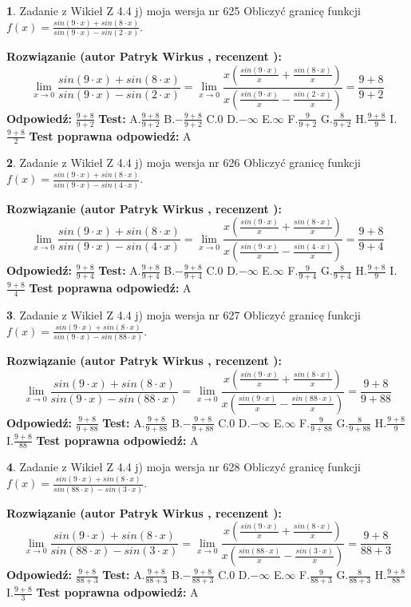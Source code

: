 \documentclass[12pt, a4paper]{article}
\theoremstyle{definition} %
\newtheorem{zad}{}
\newcommand{\zadStart}[1]{\begin{zad}#1\newline}
\newcommand{\zadStop}{\end{zad}}
\newcommand{\rozwStart}[2]{\noindent \textbf{Rozwiązanie (autor #1 , recenzent #2): }\newline}
\newcommand{\rozwStop}{\newline}
\newcommand{\odpStart}{\noindent \textbf{Odpowiedź:}\newline}
\newcommand{\odpStop}{\newline}
\newcommand{\testStart}{\noindent \textbf{Test:}\newline}
\newcommand{\testStop}{\newline}
\newcommand{\kluczStart}{\noindent \textbf{Test poprawna odpowiedź:}\newline}
\newcommand{\kluczStop}{\newline}
\begin{document}
\zadStart{Zadanie z Wikieł Z 4.4 j) moja wersja nr 625}
Obliczyć granicę funkcji $f(x)=\frac{sin(9\cdot x) +sin(8\cdot x)}{sin(9\cdot x) -sin(2\cdot x)}$.
\zadStop
\rozwStart{Patryk Wirkus}{}
$$\lim\limits_{x\to 0}\frac{sin(9\cdot x) +sin(8\cdot x)}{sin(9\cdot x) -sin(2\cdot x)}=\lim\limits_{x\to 0}\frac{x(\frac{sin(9\cdot x)}{x}+\frac{sin(8\cdot x)}{x})}{x(\frac{sin(9\cdot x)}{x}-\frac{sin(2\cdot x)}{x})}=\frac{9+8}{9+2}$$
\rozwStop
\odpStart
$\frac{9+8}{9+2}$
\odpStop
\testStart
A.$\frac{9+8}{9+2}$
B.$-\frac{9+8}{9+2}$
C.$0$
D.$-\infty$
E.$\infty$
F.$\frac{9}{9+2}$
G.$\frac{8}{9+2}$
H.$\frac{9+8}{9}$
I.$\frac{9+8}{2}$
\testStop
\kluczStart
A
\kluczStop



\zadStart{Zadanie z Wikieł Z 4.4 j) moja wersja nr 626}
Obliczyć granicę funkcji $f(x)=\frac{sin(9\cdot x) +sin(8\cdot x)}{sin(9\cdot x) -sin(4\cdot x)}$.
\zadStop
\rozwStart{Patryk Wirkus}{}
$$\lim\limits_{x\to 0}\frac{sin(9\cdot x) +sin(8\cdot x)}{sin(9\cdot x) -sin(4\cdot x)}=\lim\limits_{x\to 0}\frac{x(\frac{sin(9\cdot x)}{x}+\frac{sin(8\cdot x)}{x})}{x(\frac{sin(9\cdot x)}{x}-\frac{sin(4\cdot x)}{x})}=\frac{9+8}{9+4}$$
\rozwStop
\odpStart
$\frac{9+8}{9+4}$
\odpStop
\testStart
A.$\frac{9+8}{9+4}$
B.$-\frac{9+8}{9+4}$
C.$0$
D.$-\infty$
E.$\infty$
F.$\frac{9}{9+4}$
G.$\frac{8}{9+4}$
H.$\frac{9+8}{9}$
I.$\frac{9+8}{4}$
\testStop
\kluczStart
A
\kluczStop



\zadStart{Zadanie z Wikieł Z 4.4 j) moja wersja nr 627}
Obliczyć granicę funkcji $f(x)=\frac{sin(9\cdot x) +sin(8\cdot x)}{sin(9\cdot x) -sin(88\cdot x)}$.
\zadStop
\rozwStart{Patryk Wirkus}{}
$$\lim\limits_{x\to 0}\frac{sin(9\cdot x) +sin(8\cdot x)}{sin(9\cdot x) -sin(88\cdot x)}=\lim\limits_{x\to 0}\frac{x(\frac{sin(9\cdot x)}{x}+\frac{sin(8\cdot x)}{x})}{x(\frac{sin(9\cdot x)}{x}-\frac{sin(88\cdot x)}{x})}=\frac{9+8}{9+88}$$
\rozwStop
\odpStart
$\frac{9+8}{9+88}$
\odpStop
\testStart
A.$\frac{9+8}{9+88}$
B.$-\frac{9+8}{9+88}$
C.$0$
D.$-\infty$
E.$\infty$
F.$\frac{9}{9+88}$
G.$\frac{8}{9+88}$
H.$\frac{9+8}{9}$
I.$\frac{9+8}{88}$
\testStop
\kluczStart
A
\kluczStop



\zadStart{Zadanie z Wikieł Z 4.4 j) moja wersja nr 628}
Obliczyć granicę funkcji $f(x)=\frac{sin(9\cdot x) +sin(8\cdot x)}{sin(88\cdot x) -sin(3\cdot x)}$.
\zadStop
\rozwStart{Patryk Wirkus}{}
$$\lim\limits_{x\to 0}\frac{sin(9\cdot x) +sin(8\cdot x)}{sin(88\cdot x) -sin(3\cdot x)}=\lim\limits_{x\to 0}\frac{x(\frac{sin(9\cdot x)}{x}+\frac{sin(8\cdot x)}{x})}{x(\frac{sin(88\cdot x)}{x}-\frac{sin(3\cdot x)}{x})}=\frac{9+8}{88+3}$$
\rozwStop
\odpStart
$\frac{9+8}{88+3}$
\odpStop
\testStart
A.$\frac{9+8}{88+3}$
B.$-\frac{9+8}{88+3}$
C.$0$
D.$-\infty$
E.$\infty$
F.$\frac{9}{88+3}$
G.$\frac{8}{88+3}$
H.$\frac{9+8}{88}$
I.$\frac{9+8}{3}$
\testStop
\kluczStart
A
\kluczStop
\end{document}
